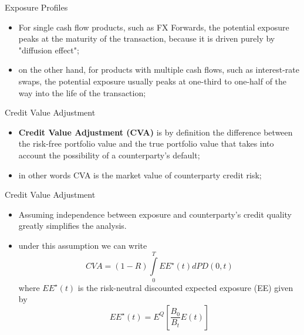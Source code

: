 \documentclass[11pt]{beamer}
\begin{document}
\begin{frame}{Exposure Profiles}
\begin{itemize}
\item For single cash flow products, such as FX Forwards, the potential exposure peaks at the maturity of the transaction, because it is driven purely by "diffusion effect";
\item on the other hand, for products with multiple cash flows, such as interest-rate swaps, the potential exposure usually peaks at one-third to one-half of the way into the life of the transaction;
\end{itemize}
\end{frame}
\begin{frame}{Credit Value Adjustment}
\begin{itemize}
\item \textbf{Credit Value Adjustment (CVA)} is by definition the difference between the risk-free portfolio value and the true portfolio value that takes into account the possibility of a counterparty's default;
\item in other words CVA is the market value of counterparty credit risk; 
\end{itemize}
\end{frame}
\begin{frame}{Credit Value Adjustment}
\begin{itemize}
\item Assuming independence between exposure and counterparty's credit quality greatly simplifies the analysis. 
\item under this assumption we can write
\begin{equation}\label{definizione CVA}
CVA= (1-R) \int\limits_0^T EE^\star (t) dPD(0,t)
\end{equation}
where $EE^\star (t)$ is the risk-neutral discounted expected exposure (EE) given by
\begin{equation}\label{definizione EE}
EE^\star (t) = E^Q \left[ \frac{B_0}{B_t} E(t) \right]
\end{equation}
\end{itemize}
\end{frame}
\end{document}
